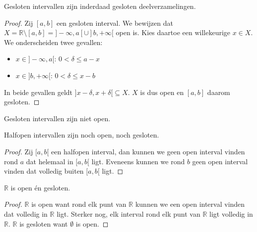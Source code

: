 \documentclass[main.tex]{subfiles}
\begin{document}
\begin{st}
  Gesloten intervallen zijn inderdaad gesloten deelverzamelingen.

  \begin{proof}
    Zij $[a,b]$ een gesloten interval.
    We bewijzen dat $X = \mathbb{R} \setminus [a,b] = ]-\infty,a[ \cup]b,+\infty[$ open is.
    Kies daartoe een willekeurige $x\in X$.
    We onderscheiden twee gevallen:
    \begin{itemize}
    \item $x \in ]-\infty,a[$: $0 < \delta \le a-x$
    \item $x \in  ]b,+\infty[$: $0 < \delta \le x-b$
    \end{itemize}
    In beide gevallen geldt $]x-\delta, x+\delta[ \subseteq X$. $X$ is dus open en $[a,b]$ daarom gesloten.
  \end{proof}
\end{st}

\begin{st}
  Gesloten intervallen zijn niet open.
\end{st}

\begin{st}
  Halfopen intervallen zijn noch open, noch gesloten.

  \begin{proof}
    Zij $[a,b[$ een halfopen interval, dan kunnen we geen open interval vinden rond $a$ dat helemaal in $[a,b[$ ligt.
    Eveneens kunnen we rond $b$ geen open interval vinden dat volledig buiten $[a,b[$ ligt.
  \end{proof}
\end{st}

\begin{st}
  \label{st:r-open-en-gesloten}
  $\mathbb{R}$ is open \'en gesloten.

  \begin{proof}
    $\mathbb{R}$ is open want rond elk punt van $\mathbb{R}$ kunnen we een open interval vinden dat volledig in $\mathbb{R}$ ligt.
    Sterker nog, elk interval rond elk punt van $\mathbb{R}$ ligt volledig in $\mathbb{R}$.
    $\mathbb{R}$ is gesloten want $\emptyset$ is open.
  \end{proof}
\end{st}
\end{document}

